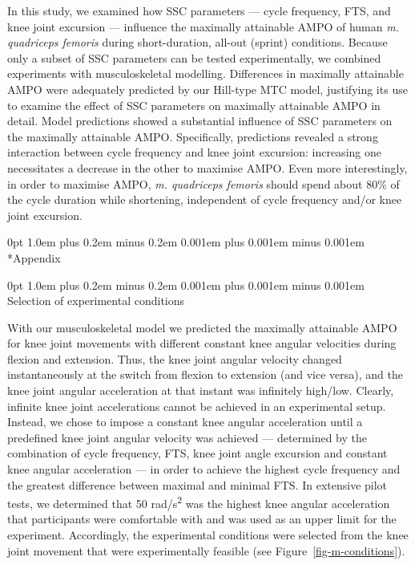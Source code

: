 \documentclass[
  11pt,
  a4paper]{article}
\makeatletter
\renewcommand{\section}{%
  \@startsection{section}{1}
    {0pt} 					%
    {1.0em plus 0.2em minus 0.2em} 	%
    {0.001em plus 0.001em minus 0.001em}    	%
    {\Large\bfseries\sffamily}%
}
\renewcommand{\subsection}{%
  \@startsection{subsection}{2}
    {0pt} 					%
    {1.0em plus 0.2em minus 0.2em} 	%
    {0.001em plus 0.001em minus 0.001em}    	%
    {\large\bfseries\sffamily}%
}
\makeatother
\begin{document}
In this study, we examined how SSC parameters --- cycle frequency, FTS,
and knee joint excursion --- influence the maximally attainable AMPO of
human \emph{m. quadriceps femoris} during short-duration, all-out
(sprint) conditions. Because only a subset of SSC parameters can be
tested experimentally, we combined experiments with musculoskeletal
modelling. Differences in maximally attainable AMPO were adequately
predicted by our Hill-type MTC model, justifying its use to examine the
effect of SSC parameters on maximally attainable AMPO in detail. Model
predictions showed a substantial influence of SSC parameters on the
maximally attainable AMPO. Specifically, predictions revealed a strong
interaction between cycle frequency and knee joint excursion: increasing
one necessitates a decrease in the other to maximise AMPO. Even more
interestingly, in order to maximise AMPO, \emph{m. quadriceps femoris}
should spend about 80\% of the cycle duration while shortening,
independent of cycle frequency and/or knee joint excursion.

\newpage{}

\appendix
{}

\section*{Appendix}\label{appendix}

\setcounter{subsection}{0} %

\renewcommand{\thesubsection}{A\arabic{subsection}}

\renewcommand{\thetable}{A\arabic{table}}
\setcounter{table}{0}

\subsection{Selection of experimental conditions}\label{sec-s-expcond}

With our musculoskeletal model we predicted the maximally attainable
AMPO for knee joint movements with different constant knee angular
velocities during flexion and extension. Thus, the knee joint angular
velocity changed instantaneously at the switch from flexion to extension
(and vice versa), and the knee joint angular acceleration at that
instant was infinitely high/low. Clearly, infinite knee joint
accelerations cannot be achieved in an experimental setup. Instead, we
chose to impose a constant knee angular acceleration until a predefined
knee joint angular velocity was achieved --- determined by the
combination of cycle frequency, FTS, knee joint angle excursion and
constant knee angular acceleration --- in order to achieve the highest
cycle frequency and the greatest difference between maximal and minimal
FTS. In extensive pilot tests, we determined that 50
rad/s\textsuperscript{2} was the highest knee angular acceleration that
participants were comfortable with and was used as an upper limit for
the experiment. Accordingly, the experimental conditions were selected
from the knee joint movement that were experimentally feasible (see
Figure~\ref{fig-m-conditions}).
\end{document}
